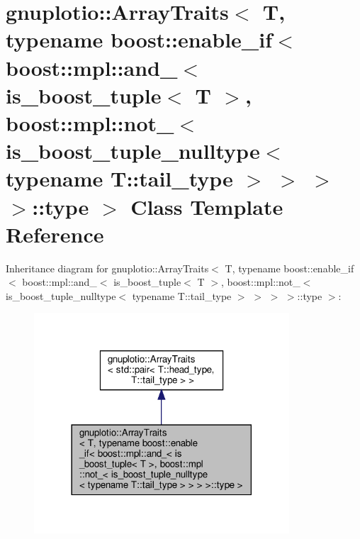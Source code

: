 \hypertarget{classgnuplotio_1_1ArrayTraits_3_01T_00_01typename_01boost_1_1enable__if_3_01boost_1_1mpl_1_1and_371638f7d82cde4b7a8a064d0797371a}{}\section{gnuplotio\+:\+:Array\+Traits$<$ T, typename boost\+:\+:enable\+\_\+if$<$ boost\+:\+:mpl\+:\+:and\+\_\+$<$ is\+\_\+boost\+\_\+tuple$<$ T $>$, boost\+:\+:mpl\+:\+:not\+\_\+$<$ is\+\_\+boost\+\_\+tuple\+\_\+nulltype$<$ typename T\+:\+:tail\+\_\+type $>$ $>$ $>$ $>$\+:\+:type $>$ Class Template Reference}
\label{classgnuplotio_1_1ArrayTraits_3_01T_00_01typename_01boost_1_1enable__if_3_01boost_1_1mpl_1_1and_371638f7d82cde4b7a8a064d0797371a}


Inheritance diagram for gnuplotio\+:\+:Array\+Traits$<$ T, typename boost\+:\+:enable\+\_\+if$<$ boost\+:\+:mpl\+:\+:and\+\_\+$<$ is\+\_\+boost\+\_\+tuple$<$ T $>$, boost\+:\+:mpl\+:\+:not\+\_\+$<$ is\+\_\+boost\+\_\+tuple\+\_\+nulltype$<$ typename T\+:\+:tail\+\_\+type $>$ $>$ $>$ $>$\+:\+:type $>$\+:
\nopagebreak
\begin{figure}[H]
\begin{center}
\leavevmode
\includegraphics[width=270pt]{classgnuplotio_1_1ArrayTraits_3_01T_00_01typename_01boost_1_1enable__if_3_01boost_1_1mpl_1_1and_691fea0d25810f91cf71bd7a5d3b39c5}
\end{center}
\end{figure}


